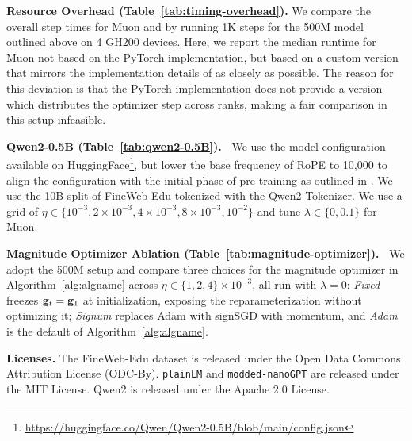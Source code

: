 \textbf{Resource Overhead (Table~\ref{tab:timing-overhead}).} We compare the overall step times for Muon and \algname{} by running 1K steps for the 500M model outlined above on 4 GH200 devices. Here, we report the median runtime for Muon not based on the PyTorch implementation, but based on a custom version that mirrors the implementation details of \algname{} as closely as possible. The reason for this deviation is that the PyTorch implementation does not provide a version which distributes the optimizer step across ranks, making a fair comparison in this setup infeasible.

\textbf{Qwen2-0.5B (Table~\ref{tab:qwen2-0.5B}).\ } We use the model configuration available on HuggingFace\footnote{\url{https://huggingface.co/Qwen/Qwen2-0.5B/blob/main/config.json}}, but lower the base frequency of RoPE to 10,000 to align the configuration with the initial phase of pre-training as outlined in \cite[Section~3.2]{yang_qwen2_2024}. We use the 10B split of FineWeb-Edu tokenized with the Qwen2-Tokenizer. We use a grid of $\eta \in \{10^{-3}, 2 \times 10^{-3}, 4 \times 10^{-3}, 8 \times 10^{-3}, 10^{-2}\}$ and tune $\lambda \in \{0, 0.1\}$ for Muon. 

\textbf{Magnitude Optimizer Ablation (Table~\ref{tab:magnitude-optimizer}).\ } We adopt the 500M setup and compare three choices for the magnitude optimizer in Algorithm~\ref{alg:algname} across $\eta \in \{1, 2, 4\}\times 10^{-3}$, all run with $\lambda=0$: \emph{Fixed} freezes $\mathbf{g}_t = \mathbf{g}_1$ at initialization, exposing the reparameterization without optimizing it; \emph{Signum} replaces Adam with signSGD with momentum, and \emph{Adam} is the default of Algorithm~\ref{alg:algname}.

\textbf{Licenses.} The FineWeb-Edu dataset \citep{lozhkov2024fineweb-edu} is released under the Open Data Commons Attribution License (ODC-By). \texttt{plainLM} \citep{ajroldi2024plainlm} and \texttt{modded-nanoGPT} \citep{modded_nanogpt_2024} are released under the MIT License. Qwen2 \citep{yang_qwen2_2024} is released under the Apache 2.0 License.